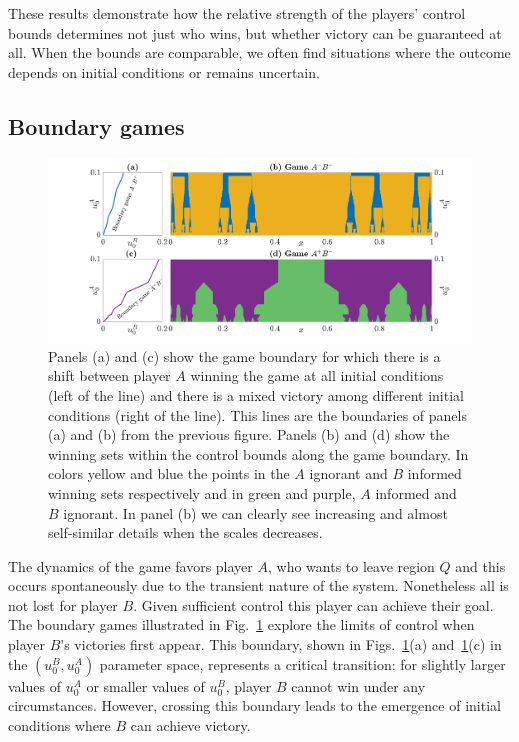 These results demonstrate how the relative strength of the players' control bounds determines not just who wins, but whether victory can be guaranteed at all. When the bounds are comparable, we often find situations where the outcome depends on initial conditions or remains uncertain.


\subsection{Boundary games}

\begin{figure}
    \centering
    \includegraphics[trim={3.3cm 0cm 0cm 0cm}, clip,width=1.06\textwidth ]{Images/P5/bifurcation.png}
    \caption{Panels (a) and (c) show the game boundary for which there is a shift between player $A$ winning the game at all initial conditions (left of the line) and there is a mixed victory among different initial conditions (right of the line). This lines are the boundaries of panels (a) and (b) from the previous figure. Panels (b) and (d) show the winning sets within the control bounds along the game boundary. In colors yellow and blue the points in the $A$ ignorant and $B$ informed winning sets respectively and in green and purple, $A$ informed and $B$ ignorant. In panel (b) we can clearly see increasing and almost self-similar details when the scales decreases.}
    \label{fig:bifurcation}
\end{figure}

The dynamics of the game favors player $A$, who wants to leave region $Q$ and this occurs spontaneously due to the transient nature of the system. Nonetheless all is not lost for player $B$. Given sufficient control this player can achieve their goal. The boundary games illustrated in Fig.~\ref{fig:bifurcation} explore the limits of control when player $B$'s  victories first appear. This boundary, shown in Figs.~\ref{fig:bifurcation}(a) and~\ref{fig:bifurcation}(c) in the $(u_0^B,u_0^A)$ parameter space, represents a critical transition: for slightly larger values of $u_0^A$ or smaller values of $u_0^B$, player $B$ cannot win under any circumstances. However, crossing this boundary leads to the emergence of initial conditions where $B$ can achieve victory.

